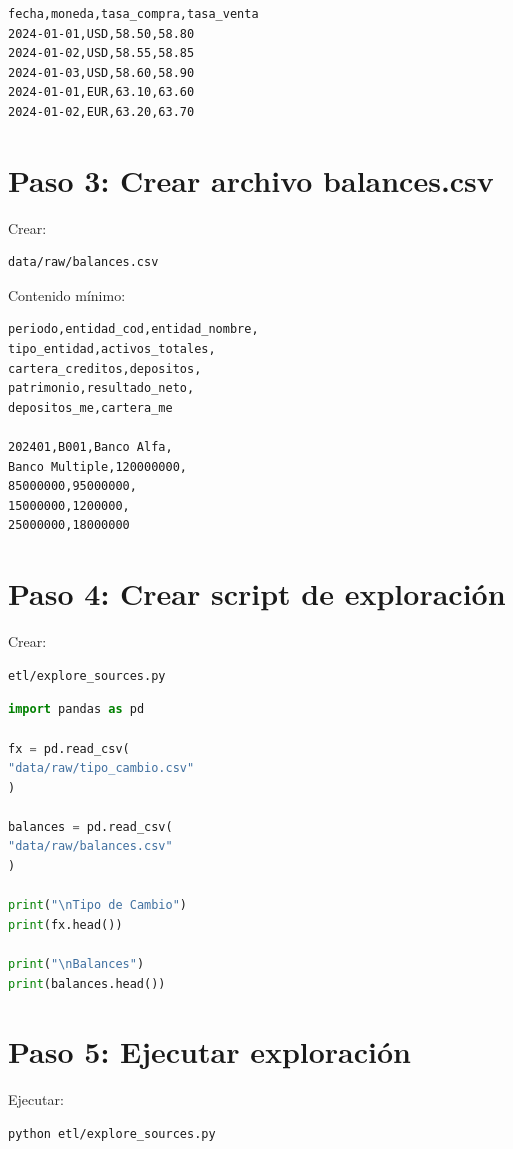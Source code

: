 \begin{verbatim}
fecha,moneda,tasa_compra,tasa_venta
2024-01-01,USD,58.50,58.80
2024-01-02,USD,58.55,58.85
2024-01-03,USD,58.60,58.90
2024-01-01,EUR,63.10,63.60
2024-01-02,EUR,63.20,63.70
\end{verbatim}

\section{Paso 3: Crear archivo balances.csv}

Crear:

\begin{verbatim}
data/raw/balances.csv
\end{verbatim}

Contenido mínimo:

\begin{verbatim}
periodo,entidad_cod,entidad_nombre,
tipo_entidad,activos_totales,
cartera_creditos,depositos,
patrimonio,resultado_neto,
depositos_me,cartera_me

202401,B001,Banco Alfa,
Banco Multiple,120000000,
85000000,95000000,
15000000,1200000,
25000000,18000000
\end{verbatim}

\section{Paso 4: Crear script de exploración}

Crear:

\begin{verbatim}
etl/explore_sources.py
\end{verbatim}

\begin{lstlisting}[language=Python]
import pandas as pd

fx = pd.read_csv(
"data/raw/tipo_cambio.csv"
)

balances = pd.read_csv(
"data/raw/balances.csv"
)

print("\nTipo de Cambio")
print(fx.head())

print("\nBalances")
print(balances.head())
\end{lstlisting}

\section{Paso 5: Ejecutar exploración}

Ejecutar:

\begin{lstlisting}[language=bash]
python etl/explore_sources.py
\end{lstlisting}

